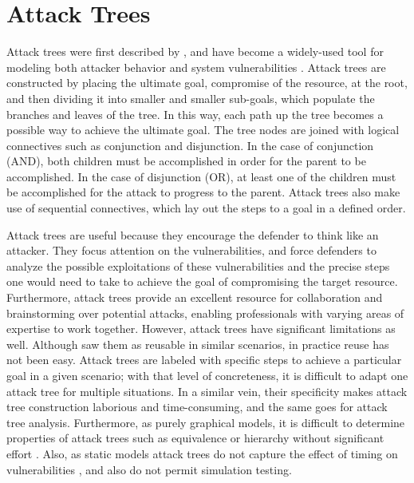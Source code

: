 \section{Attack Trees} 
Attack trees were first described by \cite{Schneier1999}, and have become a widely-used tool for modeling both attacker behavior and system vulnerabilities \cite{Pudar:2009:PPM:2639527.2639705}. Attack trees are constructed by placing the ultimate goal, compromise of the resource, at the root, and then dividing it into smaller and smaller sub-goals, which populate the branches and leaves of the tree. In this way, each path up the tree becomes a possible way to achieve the ultimate goal. The tree nodes are joined with logical connectives such as conjunction and disjunction. In the case of conjunction (AND), both children must be accomplished in order for the parent to be accomplished. In the case of disjunction (OR), at least one of the children must be accomplished for the attack to progress to the parent. Attack trees also make use of sequential connectives, which lay out the steps to a goal in a defined order.  
\par Attack trees are useful because they encourage the defender to think like an attacker. They focus attention on the vulnerabilities, and force defenders to analyze the possible exploitations of these vulnerabilities and the precise steps one would need to take to achieve the goal of compromising the target resource. Furthermore, attack trees provide an excellent resource for collaboration and brainstorming over potential attacks, enabling professionals with varying areas of expertise to work together. However, attack trees have significant limitations as well. Although \cite{Schneier1999} saw them as reusable in similar scenarios, in practice reuse has not been easy. Attack trees are labeled with specific steps to achieve a particular goal in a given scenario; with that level of concreteness, it is difficult to adapt one attack tree for multiple situations. In a similar vein, their specificity makes attack tree construction laborious and time-consuming, and the same goes for attack tree analysis. Furthermore, as purely graphical models, it is difficult to determine properties of attack trees such as equivalence or hierarchy without significant effort \cite{1652085}. Also, as static models attack trees do not capture the effect of timing on vulnerabilities \cite{Pudar:2009:PPM:2639527.2639705}, and also do not permit simulation testing.  
